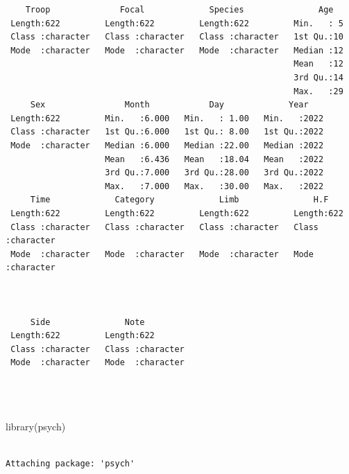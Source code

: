\documentclass[
  letterpaper,
  DIV=11,
  numbers=noendperiod]{scrartcl}
\newenvironment{Shaded}{\begin{snugshade}}{\end{snugshade}}
\newcommand{\FunctionTok}[1]{\textcolor[rgb]{0.28,0.35,0.67}{#1}}
\newcommand{\NormalTok}[1]{\textcolor[rgb]{0.00,0.23,0.31}{#1}}
\begin{document}
\begin{verbatim}
    Troop              Focal             Species               Age    
 Length:622         Length:622         Length:622         Min.   : 5  
 Class :character   Class :character   Class :character   1st Qu.:10  
 Mode  :character   Mode  :character   Mode  :character   Median :12  
                                                          Mean   :12  
                                                          3rd Qu.:14  
                                                          Max.   :29  
     Sex                Month            Day             Year     
 Length:622         Min.   :6.000   Min.   : 1.00   Min.   :2022  
 Class :character   1st Qu.:6.000   1st Qu.: 8.00   1st Qu.:2022  
 Mode  :character   Median :6.000   Median :22.00   Median :2022  
                    Mean   :6.436   Mean   :18.04   Mean   :2022  
                    3rd Qu.:7.000   3rd Qu.:28.00   3rd Qu.:2022  
                    Max.   :7.000   Max.   :30.00   Max.   :2022  
     Time             Category             Limb               H.F           
 Length:622         Length:622         Length:622         Length:622        
 Class :character   Class :character   Class :character   Class :character  
 Mode  :character   Mode  :character   Mode  :character   Mode  :character  
                                                                            
                                                                            
                                                                            
     Side               Note          
 Length:622         Length:622        
 Class :character   Class :character  
 Mode  :character   Mode  :character  
                                      
                                      
                                      
\end{verbatim}

\begin{Shaded}
\begin{Highlighting}[]
\FunctionTok{library}\NormalTok{(psych)}
\end{Highlighting}
\end{Shaded}

\begin{verbatim}

Attaching package: 'psych'
\end{verbatim}
\end{document}
